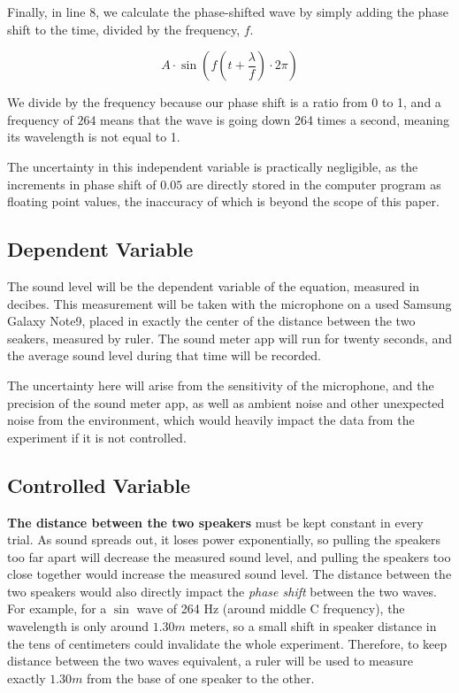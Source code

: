 \documentclass[index]{subfiles}
\begin{document}
Finally, in line 8, we calculate the phase-shifted wave by simply adding the phase shift to the time, divided by the frequency, \(f\).

\begin{equation*}
    A\cdot\sin\left(f\left(t+\frac{\lambda}{f}\right)\cdot2\pi\right)
\end{equation*}

We divide by the frequency because our phase shift is a ratio from 0 to 1, and a frequency of \(264\) means that the wave is going down 264 times a second, meaning its wavelength is not equal to 1.

The uncertainty in this independent variable is practically negligible, as the increments in phase shift of \(0.05\) are directly stored in the computer program as floating point values, the inaccuracy of which is beyond the scope of this paper.

\subsection{Dependent Variable}

The sound level will be the dependent variable of the equation, measured in decibes. This measurement will be taken with the microphone on a used Samsung Galaxy Note9, placed in exactly the center of the distance between the two seakers, measured by ruler. The sound meter app will run for twenty seconds, and the average sound level during that time will be recorded.

The uncertainty here will arise from the sensitivity of the microphone, and the precision of the sound meter app, as well as ambient noise and other unexpected noise from the environment, which would heavily impact the data from the experiment if it is not controlled.

\subsection{Controlled Variable}

\textbf{The distance between the two speakers} must be kept constant in every trial. As sound spreads out, it loses power exponentially, so pulling the speakers too far apart will decrease the measured sound level, and pulling the speakers too close together would increase the measured sound level. The distance between the two speakers would also directly impact the \textit{phase shift} between the two waves. For example, for a \(\sin\) wave of 264 Hz (around middle C frequency), the wavelength is only around \(1.30m\) meters, so a small shift in speaker distance in the tens of centimeters could invalidate the whole experiment. Therefore, to keep distance between the two waves equivalent, a ruler will be used to measure exactly \(1.30m\) from the base of one speaker to the other.
\end{document}
